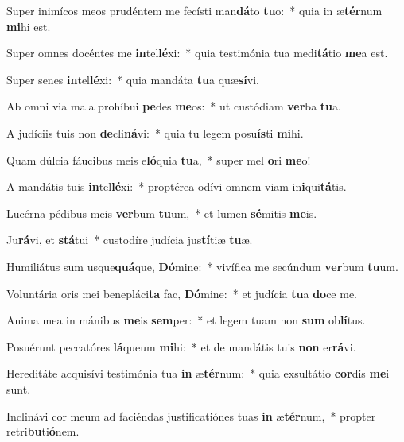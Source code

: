 \item Super inimícos meos prudéntem me fecísti man\textbf{dá}to \textbf{tu}o:~* quia in æ\textbf{tér}num \textbf{mi}hi est.
\item Super omnes docéntes me \textbf{in}tel\textbf{lé}xi:~* quia testimónia tua medi\textbf{tá}tio \textbf{me}a est.
\item Super senes \textbf{in}tel\textbf{lé}xi:~* quia mandáta \textbf{tu}a quæ\textbf{sí}vi.
\item Ab omni via mala prohíbui \textbf{pe}des \textbf{me}os:~* ut custódiam \textbf{ver}ba \textbf{tu}a.
\item A judíciis tuis non \textbf{de}cli\textbf{ná}vi:~* quia tu legem posu\textbf{ís}ti \textbf{mi}hi.
\item Quam dúlcia fáucibus meis e\textbf{ló}quia \textbf{tu}a,~* super mel \textbf{o}ri \textbf{me}o!
\item A mandátis tuis \textbf{in}tel\textbf{lé}xi:~* proptérea odívi omnem viam in\textbf{i}qui\textbf{tá}tis.
\item Lucérna pédibus meis \textbf{ver}bum \textbf{tu}um,~* et lumen \textbf{sé}mitis \textbf{me}is.
\item Ju\textbf{rá}vi, et \textbf{stá}tui~* custodíre judícia jus\textbf{tí}tiæ \textbf{tu}æ.
\item Humiliátus sum usque\textbf{quá}que, \textbf{Dó}mine:~* vivífica me secúndum \textbf{ver}bum \textbf{tu}um.
\item Voluntária oris mei benepláci\textbf{ta} fac, \textbf{Dó}mine:~* et judícia \textbf{tu}a \textbf{do}ce me.
\item Anima mea in mánibus \textbf{me}is \textbf{sem}per:~* et legem tuam non \textbf{sum} ob\textbf{lí}tus.
\item Posuérunt peccatóres \textbf{lá}queum \textbf{mi}hi:~* et de mandátis tuis \textbf{non} er\textbf{rá}vi.
\item Hereditáte acquisívi testimónia tua \textbf{in} æ\textbf{tér}num:~* quia exsultátio \textbf{cor}dis \textbf{me}i sunt.
\item Inclinávi cor meum ad faciéndas justificatiónes tuas \textbf{in} æ\textbf{tér}num,~* propter retri\textbf{bu}ti\textbf{ó}nem.
